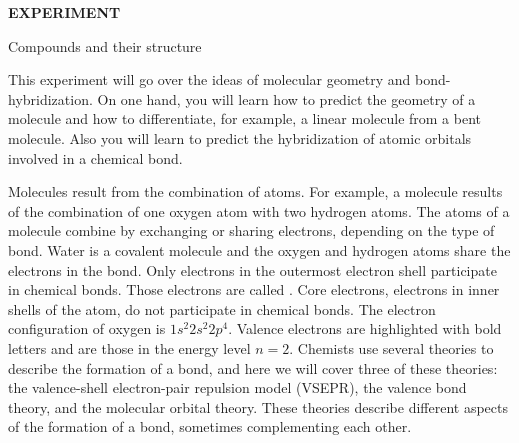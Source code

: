 \documentclass[main.tex]{subfiles}
\begin{document}


\hfill
\vspace{0.2cm}
\begin{center}
{\large \bfseries 
EXPERIMENT 
\par
\Huge
Compounds and their structure
\\[5pt] \par}
\vspace{0.2cm}
\end{center}
\par

\vspace{0.2cm}{\large \bfseries Goal}
This experiment will go over the ideas of molecular geometry and bond-hybridization. On one hand, you will learn how to predict the geometry of a molecule and how to differentiate, for example, a linear molecule from a bent molecule. Also you will learn to predict the hybridization of atomic orbitals involved in a chemical bond.


\vspace{0.2cm}{\large \bfseries Background}
Molecules result from the combination of atoms. For example, a  molecule results of the combination of one oxygen atom with two hydrogen atoms. The atoms of a molecule combine by exchanging or sharing electrons, depending on the type of bond. Water is a covalent molecule and the oxygen and hydrogen atoms share the electrons in the bond. Only electrons in the outermost electron shell participate in chemical bonds. Those electrons are called . Core electrons, electrons in inner shells of the atom, do not participate in chemical bonds. The electron configuration of oxygen is $1s^2$\textbf{$2s^2 2p^4$}. Valence electrons are highlighted with bold letters and are those in the energy level $n=2$. Chemists use several theories to describe the formation of a bond, and here we will cover three of these theories: the valence-shell electron-pair repulsion model (VSEPR), the valence bond theory, and the molecular orbital theory. These theories describe different aspects of the formation of a bond, sometimes complementing each other.
\end{document}
